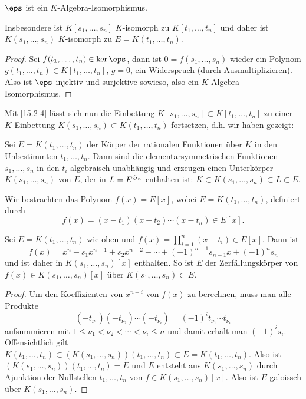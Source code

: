 \begin{st} \label{20.4-5}
	$\eps$ ist ein $K$-Algebra-Isomorphismus.

	Insbesondere ist $K[s_1, \dotsc, s_n]$ $K$-isomorph zu $K[t_1, \dotsc, t_n]$ und daher ist $K(s_1, \dotsc, s_n)$ $K$-isomorph zu $E = K(t_1, \dotsc, t_n)$.
	\begin{proof}
		Sei $f(t_1, \dotsc, t_n) \in \ker \eps$, dann ist $0 = f(s_1, \dotsc, s_n)$ wieder ein Polynom $g(t_1, \dotsc, t_n) \in K[t_1, \dotsc, t_n]$, $g = 0$, ein Widerspruch (durch Ausmultiplizieren).
		Also ist $\eps$ injektiv und surjektive sowieso, also ein $K$-Algebra-Isomorphismus.
	\end{proof}
\end{st}

Mit \ref{15.2-4} lässt sich nun die Einbettung $K[s_1, \dotsc, s_n] \subset K[t_1, \dotsc, t_n]$ zu einer $K$-Einbettung $K(s_1, \dotsc, s_n) \subset K(t_1, \dotsc, t_n)$ fortsetzen, d.h. wir haben gezeigt:

\begin{kor} \label{20.4-6}
	Sei $E = K(t_1, \dotsc, t_n)$ der Körper der rationalen Funktionen über $K$ in den Unbestimmten $t_1, \dotsc, t_n$.
	Dann sind die elementarsymmetrischen Funktionen $s_1, \dotsc, s_n$ in den $t_i$ algebraisch unabhängig und erzeugen einen Unterkörper $K(s_1, \dotsc, s_n)$ von $E$, der in $L = E^{\S_n}$ enthalten ist: $K \subset K(s_1, \dotsc, s_n) \subset L \subset E$.
\end{kor}

Wir bestrachten das Polynom $f(x) = E[x]$, wobei $E = K(t_1, \dotsc, t_n)$, definiert durch
\[
	f(x) = (x-t_1)(x-t_2) \dotsb (x-t_n) \in E[x].
\]

\begin{lem} \label{20.4-7}
	Sei $E = K(t_1, \dotsc, t_n)$ wie oben und $f(x) = \prod_{i=1}^n (x - t_i) \in E[x]$.
	Dann ist
	\[
		f(x) = x^n - s_1 x^{n-1} + s_2 x^{n-2} - \dotsb + (-1)^{n-1} s_{n-1} x + (-1)^n s_n
	\]
	und ist daher in $K(s_1,\dotsc, s_n)[x]$ enthalten.
	So ist $E$ der Zerfällungskörper von $f(x) \in K(s_1, \dotsc, s_n)[x]$ über $K(s_1, \dotsc, s_n) \subset E$.
	\begin{proof}
		Um den Koeffizienten von $x^{n-i}$ von $f(x)$ zu berechnen, muss man alle Produkte
		\[
			(-t_{\nu_1})(-t_{\nu_2}) \dotsb (-t_{\nu_i})
			= (-1)^i t_{\nu_1} \dotsb t_{\nu_i}
		\]
		aufsummieren mit $1 \le \nu_1 < \nu_2 < \dotsb < \nu_i \le n$ und damit erhält man $(-1)^i s_i$.
		Offensichtlich gilt $K(t_1, \dotsc, t_n) \subset (K(s_1,\dotsc, s_n))(t_1, \dotsc, t_n) \subset E = K(t_1, \dotsc, t_n)$.
		Also ist $(K(s_1,\dotsc, s_n))(t_1, \dotsc, t_n) = E$ und $E$ entsteht aus $K(s_1,\dotsc, s_n)$ durch Ajunktion der Nullstellen $t_1, \dotsc, t_n$ von $f \in K(s_1,\dotsc, s_n)[x]$.
		Also ist $E$ galoissch über $K(s_1, \dotsc, s_n)$.
	\end{proof}
\end{lem}

